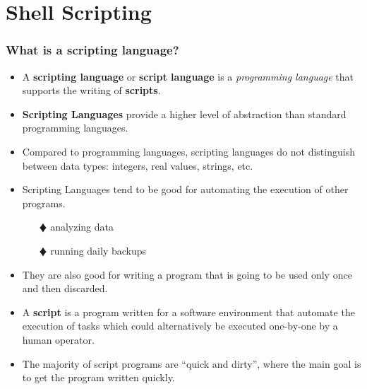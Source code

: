 \documentclass[10pt,t]{beamer}
\begin{document}
\section{Shell Scripting}
\begin{frame}
  \frametitle{What is a scripting language?}
  \begin{exampleblock}{}%
    \begin{itemize}
      \item A \textbf{scripting language} or \textbf{script language} is a \emph{programming language} that supports the writing of \textbf{scripts}.
      \item \textbf{Scripting Languages} provide a higher level of abstraction than standard programming languages.
      \item Compared to programming languages, scripting languages do not distinguish between data types: integers, real values, strings, etc.
      \item Scripting Languages tend to be good for automating the execution of other programs.
      \begin{enumerate}
          \item[$\vardiamond$] analyzing data
          \item[$\vardiamond$] running daily backups
      \end{enumerate}
      \item They are also good for writing a program that is going to be used only once and then discarded.
      \item A \textbf{script} is a program written for a software environment that automate the execution of tasks which could alternatively be executed one-by-one by a human operator.
      \item The majority of script programs are ``quick and dirty'', where the main goal is to get the program written quickly.
    \end{itemize}
  \end{exampleblock}
\end{frame}
\end{document}
